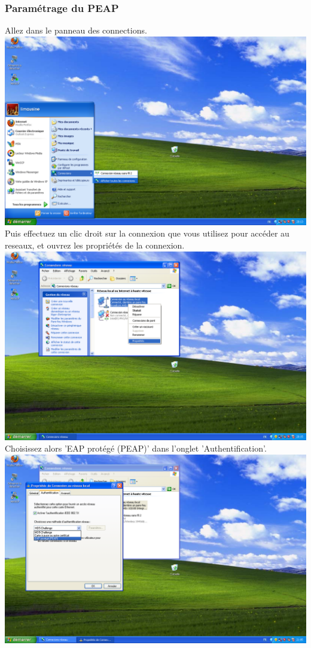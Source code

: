\subsubsection{Paramétrage du PEAP}
Allez dans le panneau des connections.\\
\includegraphics[width=\screenShotSize{}]{img/connections.PNG}\\
Puis effectuez un clic droit sur la connexion que vous utilisez pour accéder au reseaux, et ouvrez les propriétés de la connexion.\\
\includegraphics[width=\screenShotSize{}]{img/connectionProperties.PNG}\\
Choisissez alors 'EAP protégé (PEAP)' dans l'onglet 'Authentification'.\\
\includegraphics[width=\screenShotSize{}]{img/peap.PNG}\\

